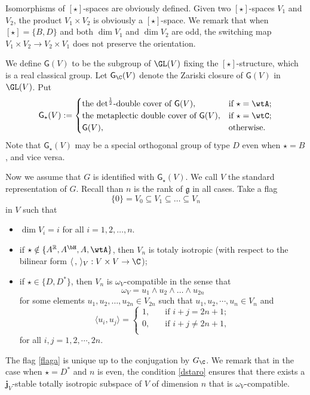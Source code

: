 \documentclass[12pt]{amsart}
\def\subset{\subseteq}
\newcommand{\g}{\mathfrak g}
\newcommand{\R}{\mathbb R}
\newcommand{\la}{\langle}
\newcommand{\ra}{\rangle}
\newcommand{\be}{\begin {equation}}
\newcommand{\ee}{\end {equation}}
\numberwithin{equation}{section}
\theoremstyle{remark}
\begin{document}
Isomorphisms of $[\star]$-spaces are obviously defined. Given two $[\star]$-spaces $V_1$ and $V_2$, the product $V_1\times V_2$ is obviously a $[\star]$-space. We remark that when $[\star]=\{B,D\}$ and both $\dim V_1$ and $\dim V_2$ are odd, the switching map $V_1\times V_2\rightarrow V_2\times V_1$ does not preserve the orientation.





 We define $\mathsf G(V)$ to be the subgroup of $\GL(V)$ fixing the $[\star]$-structure, which is a real classical group.  Let $\mathsf G_\C(V)$ denote the Zariski closure of $\mathsf G(V)$ in $\GL(V)$.
Put
\[
  \mathsf G_\star(V):=\begin{cases}
   \textrm{the $\det^{\frac{1}{2}}$-double cover of $\mathsf G(V)$},  &  \text{if $\star=\wtA$};\\
 \textrm{the metaplectic double cover of $\mathsf G(V)$},  &  \text{if $\star=\wtC$};\\
  \mathsf G(V),    &  \text{otherwise.}
    \end{cases}
\]
Note that  $\mathsf G_\star(V)$ may be a special orthogonal group of type $D$ even when $\star=B$, and vice versa.


Now we assume that $G$ is identified with $\mathsf G_\star(V)$.  We call $V$ the standard representation of $G$.
Recall than $n$ is the rank of $\g$ in all cases. Take a  flag
\be\label{flaga}
\{ 0\}= V_0 \subset V_1\subset \dots \subset  V_{n}
\ee
in $V$ such that
\begin{itemize}
 \item
$\dim V_i=i$ for all $i=1,2, \dots, n$.

\item
if $\star\notin \{A^\R, A^\bH, A, \wtA\}$, then $
  V_{n}
$ is totaly isotropic (with respect to the bilinear form $\la\,,\,\ra_V: V\times V\rightarrow \C$);

\item
if $\star\in \{D, D^*\}$, then $V_n$ is $\omega_V$-compatible    in the sense that
\[
  \omega_V= u_1\wedge u_2\wedge \dots \wedge u_{2n}%
\]
for some elements $u_1, u_2, \dots, u_{2n}\in V_{2n}$ such that $u_1, u_2, \cdots, u_n\in V_n$ and
\[
\la u_i, u_{j}\ra=\begin{cases}
   1, &\quad \textrm{if $i+j=2n+1$};\\
   0,&  \quad \textrm{if $i+j\neq 2n+1$},\\
  \end{cases}
\]
for all $i,j=1,2, \cdots, 2n$.

\end{itemize}
The flag \eqref{flaga} is unique up to the conjugation by $G_\C$. We remark that in the case when $\star=D^*$  and $n$ is even,  the condition \eqref{dstaro} ensures that there exists a
$\mathbf j_V$-stable totally isotropic subspace of $V$ of dimension $n$ that is $\omega_V$-compatible.
\end{document}
